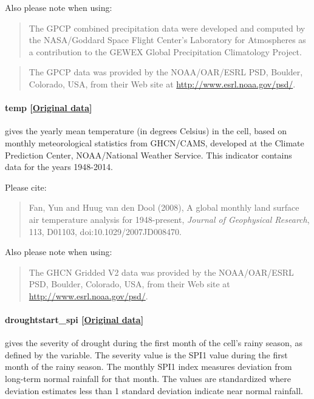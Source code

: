 \documentclass[]{book}
\begin{document}
Also please note when using:

\begin{quote}
The GPCP combined precipitation data were developed and computed by the
NASA/Goddard Space Flight Center's Laboratory for Atmospheres as a
contribution to the GEWEX Global Precipitation Climatology Project.
\end{quote}

\begin{quote}
The GPCP data was provided by the NOAA/OAR/ESRL PSD, Boulder, Colorado,
USA, from their Web site at \url{http://www.esrl.noaa.gov/psd/}.
\end{quote}

\paragraph{temp
{[}\href{http://www.esrl.noaa.gov/psd/data/gridded/data.ghcncams.html}{Original
data}{]}}\label{temp}

gives the yearly mean temperature (in degrees Celsius) in the cell,
based on monthly meteorological statistics from GHCN/CAMS, developed at
the Climate Prediction Center, NOAA/National Weather Service. This
indicator contains data for the years 1948-2014.

Please cite:

\begin{quote}
Fan, Yun and Huug van den Dool (2008), A global monthly land surface air
temperature analysis for 1948-present, \emph{Journal of Geophysical
Research}, 113, D01103, doi:10.1029/2007JD008470.
\end{quote}

Also please note when using:

\begin{quote}
The GHCN Gridded V2 data was provided by the NOAA/OAR/ESRL PSD, Boulder,
Colorado, USA, from their Web site at
\url{http://www.esrl.noaa.gov/psd/}.
\end{quote}

\paragraph{droughtstart\_spi
{[}\href{http://iridl.ldeo.columbia.edu/maproom/Global/Precipitation/SPI.html}{Original
data}{]}}\label{droughtstart-spi}

gives the severity of drought during the first month of the cell's rainy
season, as defined by the  variable. The severity value
is the SPI1 value during the first month of the rainy season. The
monthly SPI1 index measures deviation from long-term normal rainfall for
that month. The values are standardized where deviation estimates less
than 1 standard deviation indicate near normal rainfall.
\end{document}
